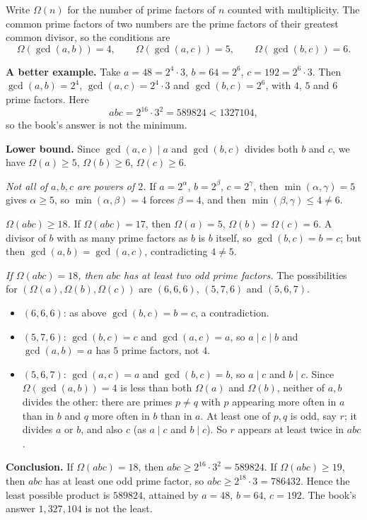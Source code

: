 Write $\Omega(n)$ for the number of prime factors of $n$ counted with multiplicity. The common prime factors of two numbers are the prime factors of their greatest common divisor, so the conditions are
\[
\Omega(\gcd(a,b))=4,\qquad\Omega(\gcd(a,c))=5,\qquad\Omega(\gcd(b,c))=6 .
\]

\textbf{A better example.} Take $a=48=2^4\cdot3$, $b=64=2^6$, $c=192=2^6\cdot3$. Then $\gcd(a,b)=2^4$, $\gcd(a,c)=2^4\cdot3$ and $\gcd(b,c)=2^6$, with $4$, $5$ and $6$ prime factors. Here
\[
abc=2^{16}\cdot3^2=589824<1327104,
\]
so the book's answer is not the minimum.

\textbf{Lower bound.} Since $\gcd(a,c)\mid a$ and $\gcd(b,c)$ divides both $b$ and $c$, we have $\Omega(a)\ge5$, $\Omega(b)\ge6$, $\Omega(c)\ge6$.

\emph{Not all of $a,b,c$ are powers of $2$.} If $a=2^\alpha$, $b=2^\beta$, $c=2^\gamma$, then $\min(\alpha,\gamma)=5$ gives $\alpha\ge5$, so $\min(\alpha,\beta)=4$ forces $\beta=4$, and then $\min(\beta,\gamma)\le4\ne6$.

\emph{$\Omega(abc)\ge18$.} If $\Omega(abc)=17$, then $\Omega(a)=5$, $\Omega(b)=\Omega(c)=6$. A divisor of $b$ with as many prime factors as $b$ is $b$ itself, so $\gcd(b,c)=b=c$; but then $\gcd(a,b)=\gcd(a,c)$, contradicting $4\ne5$.

\emph{If $\Omega(abc)=18$, then $abc$ has at least two odd prime factors.} The possibilities for $\left(\Omega(a),\Omega(b),\Omega(c)\right)$ are $(6,6,6)$, $(5,7,6)$ and $(5,6,7)$.
\begin{itemize}
\item $(6,6,6)$: as above $\gcd(b,c)=b=c$, a contradiction.
\item $(5,7,6)$: $\gcd(b,c)=c$ and $\gcd(a,c)=a$, so $a\mid c\mid b$ and $\gcd(a,b)=a$ has $5$ prime factors, not $4$.
\item $(5,6,7)$: $\gcd(a,c)=a$ and $\gcd(b,c)=b$, so $a\mid c$ and $b\mid c$. Since $\Omega(\gcd(a,b))=4$ is less than both $\Omega(a)$ and $\Omega(b)$, neither of $a,b$ divides the other: there are primes $p\ne q$ with $p$ appearing more often in $a$ than in $b$ and $q$ more often in $b$ than in $a$. At least one of $p,q$ is odd, say $r$; it divides $a$ or $b$, and also $c$ (as $a\mid c$ and $b\mid c$). So $r$ appears at least twice in $abc$.
\end{itemize}

\textbf{Conclusion.} If $\Omega(abc)=18$, then $abc\ge2^{16}\cdot3^2=589824$. If $\Omega(abc)\ge19$, then $abc$ has at least one odd prime factor, so $abc\ge2^{18}\cdot3=786432$. Hence the least possible product is $\boxed{589824}$, attained by $a=48$, $b=64$, $c=192$. The book's answer $1{,}327{,}104$ is not the least.
